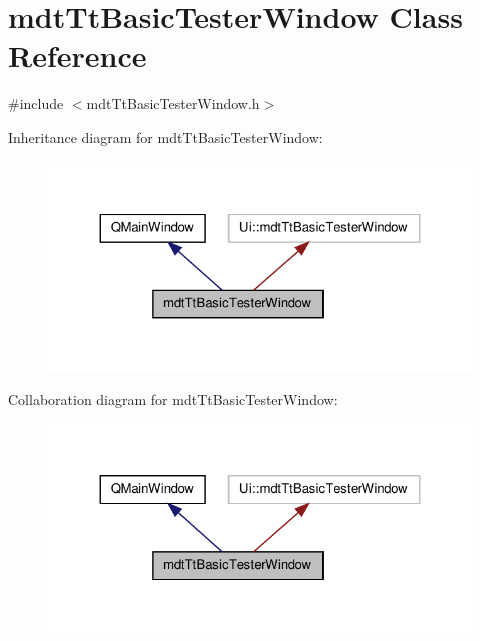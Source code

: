 \hypertarget{classmdt_tt_basic_tester_window}{\section{mdt\-Tt\-Basic\-Tester\-Window Class Reference}
\label{classmdt_tt_basic_tester_window}
}


{\ttfamily \#include $<$mdt\-Tt\-Basic\-Tester\-Window.\-h$>$}



Inheritance diagram for mdt\-Tt\-Basic\-Tester\-Window\-:\nopagebreak
\begin{figure}[H]
\begin{center}
\leavevmode
\includegraphics[width=324pt]{classmdt_tt_basic_tester_window__inherit__graph}
\end{center}
\end{figure}


Collaboration diagram for mdt\-Tt\-Basic\-Tester\-Window\-:\nopagebreak
\begin{figure}[H]
\begin{center}
\leavevmode
\includegraphics[width=324pt]{classmdt_tt_basic_tester_window__coll__graph}
\end{center}
\end{figure}
